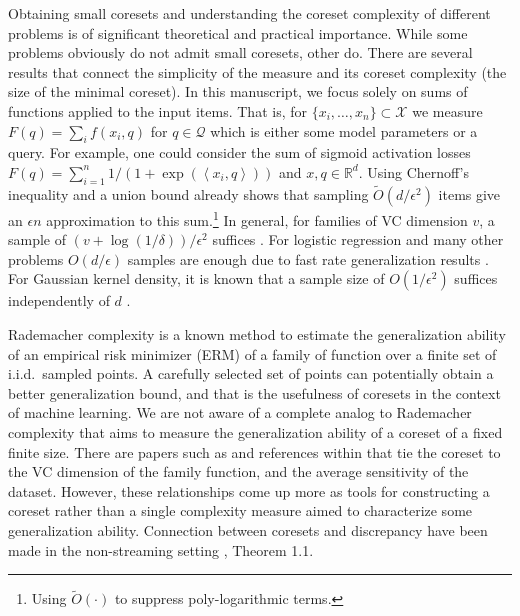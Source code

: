 \documentclass[anon,12pt]{colt2019} %
\newcommand{\ip}[1]{\left \langle #1 \right \rangle}
\newcommand{\R}{\mathbb{R}}
\newcommand{\eps}{\epsilon}
\newcommand{\X}{\mathcal{X}}
\newcommand{\Q}{\mathcal{Q}}
\begin{document}
Obtaining small coresets and understanding the coreset complexity of different problems is of significant theoretical and practical importance.
While some problems obviously do not admit small coresets, other do. 
There are several results that connect the simplicity of the measure and its coreset complexity (the size of the minimal coreset).
In this manuscript, we focus solely on sums of functions applied to the input items.
That is, for $\{x_i,\ldots,x_n\} \subset \X$ we measure $F(q) = \sum_i f(x_i,q)$ for $q \in \Q$ which is either some model parameters or a query.
For example, one could consider the sum of sigmoid activation losses $F(q) = \sum_{i=1}^{n} 1/(1+ \exp(\ip{x_i,q}))$ and $x,q\in \R^d$.
Using Chernoff's inequality and a union bound already shows that sampling $\tilde O(d/\eps^2)$ items give an $\eps n$ approximation to this sum.\footnote{Using $\tilde O(\cdot)$ to suppress poly-logarithmic terms.} 
In general, for families of VC dimension $v$, a sample of $(v+\log(1/\delta))/\eps^2$ suffices \cite{talagrand1994sharper}.
For logistic regression and many other problems $O(d/\eps)$ samples are enough due to fast rate generalization results \cite{van2015fast}.
For Gaussian kernel density, it is known that a sample size of $O(1/\eps^2)$ suffices independently of $d$  \cite{lopez2015towards}.

Rademacher complexity \cite{Bartlett:2003:RGC:944919.944944} is a known method to estimate the generalization ability of an empirical risk minimizer (ERM) of a family of function over a finite set of i.i.d.\ sampled points. A carefully selected set of points can potentially obtain a better generalization bound, and that is the usefulness of coresets in the context of machine learning. We are not aware of a complete analog to Rademacher complexity that aims to measure the generalization ability of a coreset of a fixed finite size. There are papers such as \cite{langberg2010universal, tolochinsky2018coresets} and references within that tie the coreset to the VC dimension of the family function, and the average sensitivity of the dataset. However, these relationships come up more as tools for constructing a coreset rather than a single complexity measure aimed to characterize some generalization ability. 
Connection between coresets and discrepancy have been made in the non-streaming setting \cite{phillips2009small}, Theorem 1.1.
\end{document}
